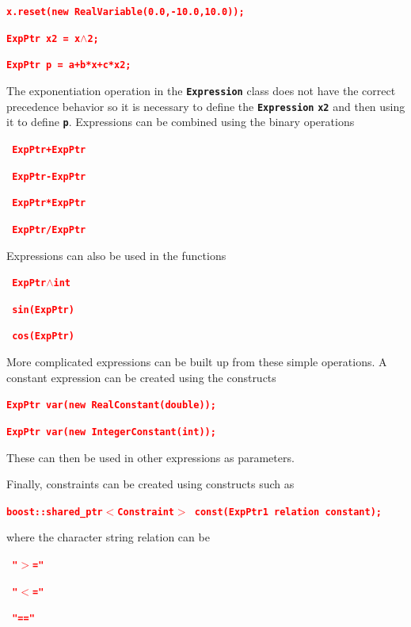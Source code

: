 \documentclass[12pt]{report} %
\begin{document}
\textcolor{red}{\texttt{\textbf{x.reset(new RealVariable(0.0,-10.0,10.0));}}}

\textcolor{red}{\texttt{\textbf{ExpPtr x2 = x$\boldsymbol{\mathrm{\wedge}}$2;}}}

\textcolor{red}{\texttt{\textbf{ExpPtr p = a+b*x+c*x2;}}}

The exponentiation operation in the \texttt{\textbf{Expression}} class does not have the correct precedence behavior so it is necessary to define the \texttt{\textbf{Expression}} \texttt{\textbf{x2}} and then using it to define \texttt{\textbf{p}}. Expressions can be combined using the binary operations

\textcolor{red}{\texttt{\textbf{    ExpPtr+ExpPtr}}}

\textcolor{red}{\texttt{\textbf{    ExpPtr-ExpPtr}}}

\textcolor{red}{\texttt{\textbf{    ExpPtr*ExpPtr}}}

\textcolor{red}{\texttt{\textbf{    ExpPtr/ExpPtr}}}

Expressions can also be used in the functions

\textcolor{red}{\texttt{\textbf{    ExpPtr$\boldsymbol{\mathrm{\wedge}}$int}}}

\textcolor{red}{\texttt{\textbf{    sin(ExpPtr)}}}

\textcolor{red}{\texttt{\textbf{    cos(ExpPtr)}}}

More complicated expressions can be built up from these simple operations. A constant expression can be created using the constructs

\textcolor{red}{\texttt{\textbf{ExpPtr var(new RealConstant(double));}}}

\textcolor{red}{\texttt{\textbf{ExpPtr var(new IntegerConstant(int));}}}

These can then be used in other expressions as parameters.

Finally, constraints can be created using constructs such as

\textcolor{red}{\texttt{\textbf{boost::shared\_ptr$\boldsymbol{\mathrm{<}}$Constraint$\boldsymbol{\mathrm{>}}$ const(ExpPtr1 relation constant);}}}

where the character string relation can be

\textcolor{red}{\texttt{\textbf{    "$\boldsymbol{\mathrm{>}}$="}}}

\textcolor{red}{\texttt{\textbf{    "$\boldsymbol{\mathrm{<}}$="}}}

\textcolor{red}{\texttt{\textbf{    "=="}}}
\end{document}
